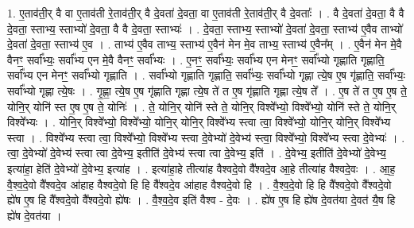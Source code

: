 \documentclass[17pt]{extarticle}
\begin{document}
1. ए॒ताव॑ती॒र् वै वा ए॒ताव॑ती रे॒ताव॑ती॒र् वै दे॒वता॑ दे॒वता॒ वा ए॒ताव॑ती रे॒ताव॑ती॒र् वै दे॒वताः᳚ । . वै दे॒वता॑ दे॒वता॒ वै वै दे॒वता॒ स्ताभ्य॒ स्ताभ्यो॑ दे॒वता॒ वै वै दे॒वता॒ स्ताभ्यः॑ । . दे॒वता॒ स्ताभ्य॒ स्ताभ्यो॑ दे॒वता॑ दे॒वता॒ स्ताभ्य॑ ए॒वैव ताभ्यो॑ दे॒वता॑ दे॒वता॒ स्ताभ्य॑ ए॒व । . ताभ्य॑ ए॒वैव ताभ्य॒ स्ताभ्य॑ ए॒वैन॑ मेन मे॒व ताभ्य॒ स्ताभ्य॑ ए॒वैन᳚म् । . ए॒वैन॑ मेन मे॒वै वैनꣳ॒॒ सर्वा᳚भ्यः॒ सर्वा᳚भ्य एन मे॒वै वैनꣳ॒॒ सर्वा᳚भ्यः । . ए॒नꣳ॒॒ सर्वा᳚भ्यः॒ सर्वा᳚भ्य एन मेनꣳ॒॒ सर्वा᳚भ्यो गृह्णाति गृह्णाति॒ सर्वा᳚भ्य एन मेनꣳ॒॒ सर्वा᳚भ्यो गृह्णाति । . सर्वा᳚भ्यो गृह्णाति गृह्णाति॒ सर्वा᳚भ्यः॒ सर्वा᳚भ्यो गृह्णा त्ये॒ष ए॒ष गृ॑ह्णाति॒ सर्वा᳚भ्यः॒ सर्वा᳚भ्यो गृह्णा त्ये॒षः । . गृ॒ह्णा॒ त्ये॒ष ए॒ष गृ॑ह्णाति गृह्णा त्ये॒ष ते॑ त ए॒ष गृ॑ह्णाति गृह्णा त्ये॒ष ते᳚ । . ए॒ष ते॑ त ए॒ष ए॒ष ते॒ योनि॒र् योनि॑ स्त ए॒ष ए॒ष ते॒ योनिः॑ । . ते॒ योनि॒र् योनि॑ स्ते ते॒ योनि॒र् विश्वे᳚भ्यो॒ विश्वे᳚भ्यो॒ योनि॑ स्ते ते॒ योनि॒र् विश्वे᳚भ्यः । . योनि॒र् विश्वे᳚भ्यो॒ विश्वे᳚भ्यो॒ योनि॒र् योनि॒र् विश्वे᳚भ्य स्त्वा त्वा॒ विश्वे᳚भ्यो॒ योनि॒र् योनि॒र् विश्वे᳚भ्य स्त्वा । . विश्वे᳚भ्य स्त्वा त्वा॒ विश्वे᳚भ्यो॒ विश्वे᳚भ्य स्त्वा दे॒वेभ्यो॑ दे॒वेभ्य॑ स्त्वा॒ विश्वे᳚भ्यो॒ विश्वे᳚भ्य स्त्वा दे॒वेभ्यः॑ । . त्वा॒ दे॒वेभ्यो॑ दे॒वेभ्य॑ स्त्वा त्वा दे॒वेभ्य॒ इतीति॑ दे॒वेभ्य॑ स्त्वा त्वा दे॒वेभ्य॒ इति॑ । . दे॒वेभ्य॒ इतीति॑ दे॒वेभ्यो॑ दे॒वेभ्य॒ इत्या॑हा॒ हेति॑ दे॒वेभ्यो॑ दे॒वेभ्य॒ इत्या॑ह । . इत्या॑हा॒हे तीत्या॑ह वैश्वदे॒वो वै᳚श्वदे॒व आ॒हे तीत्या॑ह वैश्वदे॒वः । . आ॒ह॒ वै॒श्व॒दे॒वो वै᳚श्वदे॒व आ॑हाह वैश्वदे॒वो हि हि वै᳚श्वदे॒व आ॑हाह वैश्वदे॒वो हि । . वै॒श्व॒दे॒वो हि हि वै᳚श्वदे॒वो वै᳚श्वदे॒वो ह्ये॑ष ए॒ष हि वै᳚श्वदे॒वो वै᳚श्वदे॒वो ह्ये॑षः । . वै॒श्व॒दे॒व इति॑ वैश्व - दे॒वः । . ह्ये॑ष ए॒ष हि ह्ये॑ष दे॒वत॑या दे॒वत॑ यै॒ष हि ह्ये॑ष दे॒वत॑या । \newline
\end{document}
